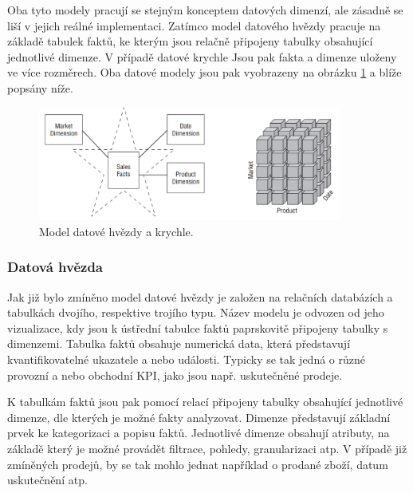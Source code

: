\documentclass[
  digital,     %
  twoside,     %
  lof,         %
  lot,         %
]{fithesis4}
\begin{document}
Oba tyto modely pracují se stejným konceptem datových dimenzí, ale zásadně se liší v jejich reálné implementaci. Zatímco model datového hvězdy pracuje na základě  tabulek faktů, ke kterým jsou relačně připojeny tabulky obsahující jednotlivé dimenze. V případě datové krychle Jsou pak fakta a dimenze uloženy ve více rozměrech.\parencite[s.9]{Kimball2013} Oba datové modely jsou pak vyobrazeny na obrázku \ref{fig:star_olap} a blíže popsány níže. 
\begin{figure}[h]
  \begin{center}
          \includegraphics[width=10cm]{img/star_olap.png}
  \end{center}
  \caption{Model datové hvězdy a krychle.  \parencite[s.9]{Kimball2013}}
  \label{fig:star_olap}
\end{figure}  

\subsubsection{Datová hvězda}
Jak již bylo zmíněno model datové hvězdy je založen na relačních databázích a tabulkách dvojího, respektive trojího typu. Název modelu je odvozen od jeho vizualizace, kdy jsou k ústřední tabulce faktů paprskovitě připojeny tabulky s dimenzemi. Tabulka faktů obsahuje numerická data, která představují kvantifikovatelné ukazatele a nebo události.\parencite[s.10]{Kimball2013} Typicky se tak jedná o různé provozní a nebo obchodní KPI, jako jsou např. uskutečněné prodeje.

K tabulkám faktů jsou pak pomocí relací připojeny tabulky obsahující jednotlivé dimenze, dle kterých je možné fakty analyzovat. Dimenze představují základní prvek ke kategorizaci a popisu faktů. Jednotlivé dimenze obsahují atributy, na základě který je možné provádět filtrace, pohledy, granularizaci atp. V případě již zmíněných prodejů, by se tak mohlo jednat například o prodané zboží, datum uskutečnění atp.
\end{document}
